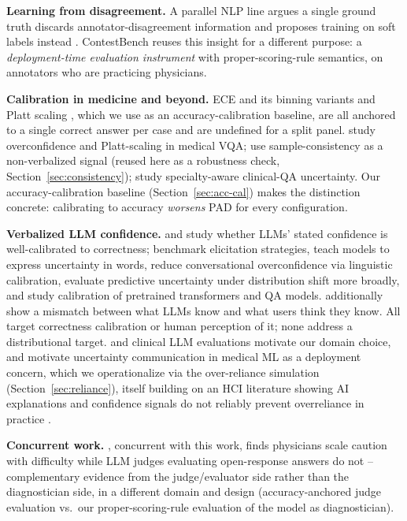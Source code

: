 \documentclass[letterpaper]{article} %
\begin{document}
\textbf{Learning from disagreement.} A parallel NLP line argues a single
ground truth discards annotator-disagreement information and proposes
training on soft labels instead \citep{davani2022dealing,uma2021learning}.
ContestBench reuses this insight for a different purpose: a
\emph{deployment-time evaluation instrument} with proper-scoring-rule
semantics, on annotators who are practicing physicians.

\textbf{Calibration in medicine and beyond.} ECE and its binning variants
\citep{guo2017calibration,naeini2015obtaining} and Platt scaling
\citep{platt1999probabilistic}, which we use as an accuracy-calibration
baseline, are all anchored to a single correct answer per case and are
undefined for a split panel. \citet{byun2026overconfidence} study
overconfidence and Platt-scaling in medical VQA; \citet{savage2025jamia} use
sample-consistency as a non-verbalized signal (reused here as a robustness
check, Section~\ref{sec:consistency}); \citet{testoni2026mindthegap} study
specialty-aware clinical-QA uncertainty. Our accuracy-calibration baseline
(Section~\ref{sec:acc-cal}) makes the distinction concrete: calibrating to
accuracy \emph{worsens} PAD for every configuration.

\textbf{Verbalized LLM confidence.} \citet{kadavath2022languagemodels} and
\citet{tian2023justask} study whether LLMs' stated confidence is
well-calibrated to correctness; \citet{xiong2024llmsexpress} benchmark
elicitation strategies, \citet{lin2022teaching} teach models to express
uncertainty in words, \citet{mielke2022reducing} reduce conversational
overconfidence via linguistic calibration, \citet{ovadia2019trust} evaluate
predictive uncertainty under distribution shift more broadly, and
\citet{jiang2021know,desai2020calibration} study calibration of pretrained
transformers and QA models. \citet{steyvers2025what} additionally show a
mismatch between what LLMs know and what users think they know. All target
correctness calibration or human perception of it; none address a
distributional target. \citet{singhal2023large} and clinical LLM evaluations
motivate our domain choice, and \citet{kompa2021second} motivate uncertainty
communication in medical ML as a deployment concern, which we operationalize
via the over-reliance simulation (Section~\ref{sec:reliance}), itself
building on an HCI literature showing AI explanations and confidence
signals do not reliably prevent overreliance in practice
\citep{bansal2021does,bucinca2021trust,passi2022overreliance}.

\textbf{Concurrent work.} \citet{medqade2026}, concurrent with this work,
finds physicians scale caution with difficulty while LLM judges evaluating
open-response answers do not -- complementary evidence from the
judge/evaluator side rather than the diagnostician side, in a different
domain and design (accuracy-anchored judge evaluation vs.\ our
proper-scoring-rule evaluation of the model as diagnostician).
\end{document}
